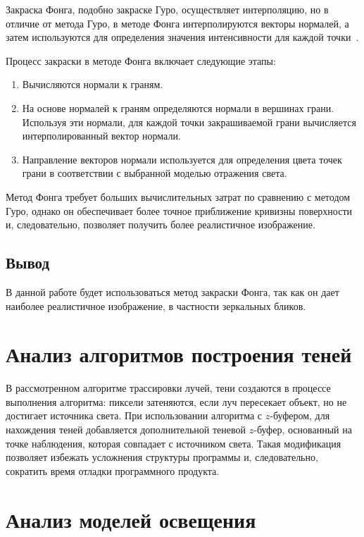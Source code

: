 Закраска Фонга, подобно закраске Гуро, осуществляет интерполяцию, но в отличие от метода Гуро, в методе Фонга интерполируются векторы нормалей, а затем используются для определения значения интенсивности для каждой точки~\cite{kurov}.

Процесс закраски в методе Фонга включает следующие этапы:
\begin{enumerate}[label=\arabic*)]
	\item Вычисляются нормали к граням.
	\item На основе нормалей к граням определяются нормали в вершинах грани. Используя эти нормали, для каждой точки закрашиваемой грани вычисляется интерполированный вектор нормали.
	\item Направление векторов нормали используется для определения цвета точек грани в соответствии с выбранной моделью отражения света.
\end{enumerate}

Метод Фонга требует больших вычислительных затрат по сравнению с методом Гуро, однако он обеспечивает более точное приближение кривизны поверхности и, следовательно, позволяет получить более реалистичное изображение.

\subsection*{Вывод}

В данной работе будет использоваться метод закраски Фонга, так как он дает наиболее реалистичное изображение, в частности зеркальных бликов.

\section{Анализ алгоритмов построения теней}

В рассмотренном алгоритме трассировки лучей, тени создаются в процессе выполнения алгоритма: пиксели затеняются, если луч пересекает объект, но не достигает источника света. 
При использовании алгоритма с $z$-буфером, для нахождения теней добавляется дополнительной теневой $z$-буфер, основанный на точке наблюдения, которая совпадает с источником света. Такая модификация позволяет избежать усложнения структуры программы и, следовательно, сократить время отладки программного продукта.

\section{Анализ моделей освещения}

